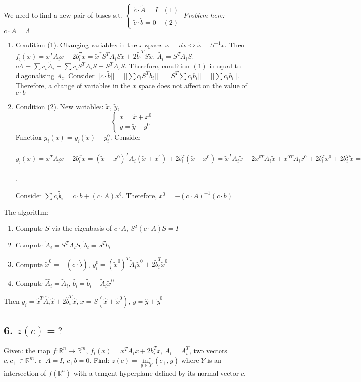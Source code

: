 \documentclass[a4paper]{article}
\begin{document}
We need to find a new pair of bases s.t. $\begin{cases}
\tilde{c}\cdot \tilde{A}=I & (1)\\
\tilde{c}\cdot \tilde{b}=0 & (2)
\end{cases}$
{\em Problem here: $c\cdot A=\Lambda$}
\begin{enumerate}
\item Condition (1). Changing variables in the $x$ space: $x=S\tilde{x}\Leftrightarrow \tilde{x}=S^{-1}x$. Then $f_i(x)=x^TA_ix+2b_i^Tx=\tilde{x}^TS^TA_iS\tilde{x}+2\tilde{b_i}^TS\tilde{x}$. $\tilde{A_i}=S^TA_iS$. $c\tilde{A}=\sum c_i\tilde{A_i}=\sum\limits c_iS^TA_iS=S^TA_cS$. Therefore, condition $(1)$ is equal to diagonalising $A_c$. Consider $||c\cdot \tilde{b}||=||\sum c_iS^Tb_i||=||S^T\sum c_ib_i||=||\sum c_ib_i||$. Therefore, a change of variables in the $x$ space does not affect on the value of $c\cdot b$
\item Condition (2). New variables: $\tilde{x},\,\tilde{y}$,
$$\begin{cases}
x=\tilde{x}+x^0\\
y=\tilde{y}+y^0
\end{cases}$$
Function $y_i(x)=\tilde{y}_i(\tilde{x})+y^0_i$. Consider $y_i(x)=x^TA_ix+2b_i^Tx=(\tilde{x}+x^0)^TA_i(\tilde{x}+x^0)+2b_i^T(\tilde{x}+x^0)=\tilde{x}^TA_i\tilde{x}+2x^{0T}A_i\tilde{x}+x^{0T}A_ix^0+2b_i^Tx^0+2b_i^T\tilde{x}=\tilde{x}^TA_i\tilde{x}+2(\underbrace{b_i+A_ix^0}_{\tilde{b}_i})^T\tilde{x}+\underbrace{x^{0T}A_ix^0+2b_i^Tx^0}_{y^0_i}$.

Consider $\sum c_i\tilde{b}_i=c\cdot b +(c\cdot A)x^0$. Therefore, $x^0=-(c\cdot A)^{-1}(c\cdot b)$
\end{enumerate}

The algorithm:
\begin{enumerate}
\item Compute $S$ via the eigenbasis of $c\cdot A$, $S^T(c\cdot A)S=I$
\item Compute $\tilde{A}_i=S^TA_iS$, $\tilde{b}_i=S^Tb_i$
\item Compute $\tilde{x}^0=-(c\cdot \tilde{b})$, $y^0_i=(\tilde{x}^0)^T\tilde{A}_i\tilde{x}^0+2\tilde{b}_i^T\tilde{x}^0$
\item Compute $\hat{A}_i=\tilde{A}_i$, $\hat{b}_i=\tilde{b}_i+\tilde{A}_i\tilde{x}^0$
\end{enumerate}
Then $\hat{y}_i=\hat{x}^T\hat{A}_i\hat{x}+2\hat{b}_i^T\hat{x}$, $x=S(\hat{x}+\tilde{x}^0)$, $y=\hat{y}+\tilde{y}^0$
\subsection*{6. $z(c)=?$}
Given: the map $f\colon\mathbb{R}^n\to\mathbb{R}^m$, $f_i(x)=x^TA_ix+2b_i^Tx$, $A_i=A_i^T$, two vectors $c,c_+\in\mathbb{R}^m$. $c_+A=I$, $c_+b=0$.
Find: $z(c)=\inf\limits_{y\in Y} (c_+, y)$ where $Y$ is an intersection of $f(\mathbb{R}^n)$ with a tangent hyperplane defined by its normal vector $c$.
\end{document}
